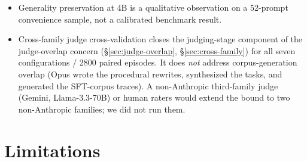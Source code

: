 \documentclass[10pt]{article}
\begin{document}
\begin{itemize}[leftmargin=*, nosep]
  \item Generality preservation at 4B is a qualitative observation on a 52-prompt convenience sample, not a calibrated benchmark result.
  \item Cross-family judge cross-validation closes the judging-stage component of the judge-overlap concern (\S\ref{sec:judge-overlap}, \S\ref{sec:cross-family}) for all seven configurations / 2800 paired episodes. It does \emph{not} address corpus-generation overlap (Opus wrote the procedural rewrites, synthesized the tasks, and generated the SFT-corpus traces). A non-Anthropic third-family judge (Gemini, Llama-3.3-70B) or human raters would extend the bound to two non-Anthropic families; we did not run them.
\end{itemize}

\section{Limitations}\label{sec:limitations}
\end{document}
